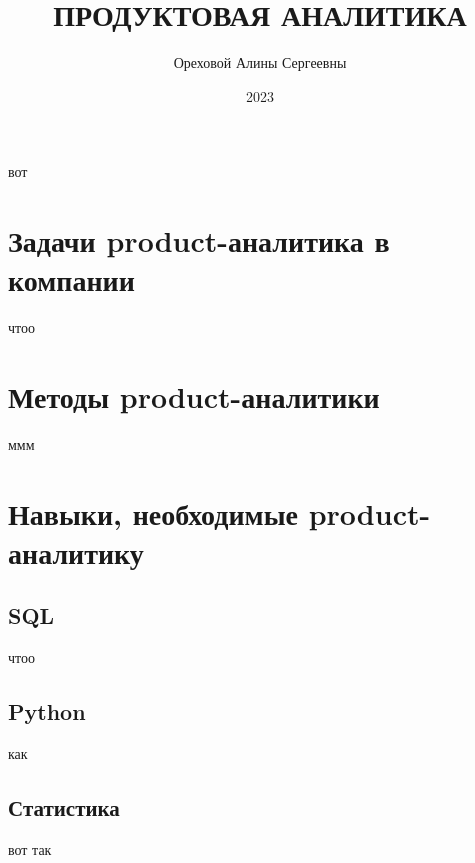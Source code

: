 \documentclass[referat, times]{SCWorks}
\begin{document}

\title{ПРОДУКТОВАЯ АНАЛИТИКА}




\author{Ореховой Алины Сергеевны}

\date{2023}

\maketitle

\tableofcontents

\intro
вот
\section {Задачи product-аналитика в компании}
чтоо

\section{Методы product-аналитики}
ммм

\section{Навыки, необходимые product-аналитику}

\subsection{SQL}
чтоо

\subsection{Python}
как 

\subsection{Статистика}
вот так
\end{document}
